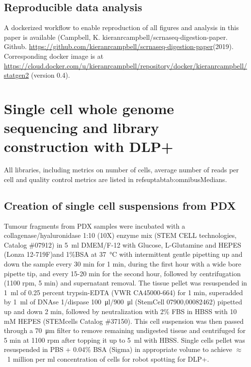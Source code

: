 \subsection{Reproducible data analysis}
A dockerized workflow to enable reproduction of all figures and analysis in this paper is available (Campbell, K. kieranrcampbell/scrnaseq-digestion-paper. Github. \url{https://github.com/kieranrcampbell/scrnaseq-digestion-paper}(2019). Corresponding docker image is at \url{https://cloud.docker.com/u/kieranrcampbell/repository/docker/kieranrcampbell/statgen2} (version 0.4).

\section{Single cell whole genome sequencing and library construction with DLP+}

All libraries, including metrics on number of cells, average number of reads per cell and quality control metrics are listed in refsuptab{tab:omnibusMedians}.

\subsection{Creation of single cell suspensions from PDX}
Tumour fragments from PDX samples were incubated with a collagenase/hyaluronidase 1:10 (10X) enzyme mix (STEM CELL technologies, Catalog \#07912) in  \SI{5}{\ml} DMEM/F-12 with Glucose, L-Glutamine and HEPES (Lonza 12-719F)and 1\%BSA at \SI{37}{\degreeCelsius} with intermittent gentle pipetting up and down the sample every 30 min for 1 min, during the first hour with a wide bore pipette tip, and every 15-20 min for the second hour, followed by  centrifugation (1100 rpm, 5 min) and supernatant removal.
The tissue pellet was resuspended in \SI{1}{\ml} of  0.25 percent trypsin-EDTA (VWR CA45000-664) for 1 min, superadded by \SI{1}{\ml} of DNAse 1/dispase \SI{100}{\ul}/\SI{900}{\ul} (StemCell 07900,00082462) pipetted up and down 2 min, followed by neutralization with 2\% FBS in HBSS with 10 mM HEPES (STEMcells Catalog \#37150). 
This cell suspension was then passed through a \SI{70}{\micro\metre} filter to remove remaining undigested tissue and centrifuged for 5 min at 1100 rpm after topping it up to \SI{5}{\ml} with HBSS.
Single cells pellet  was resuspended in PBS + 0.04\% BSA (Sigma) in appropriate volume to achieve  $\approx$~1 million per ml concentration of cells for robot spotting for DLP+.

